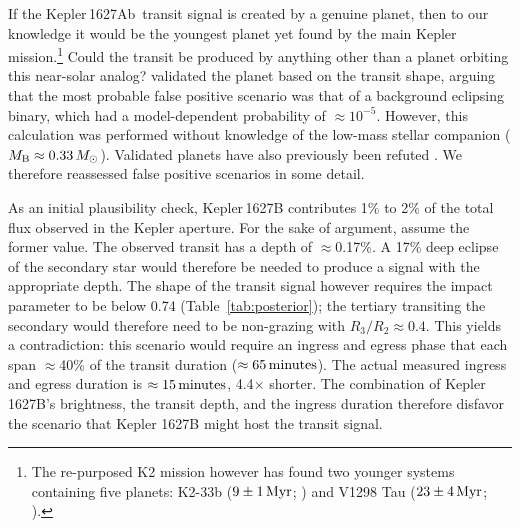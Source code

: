 \documentclass[12pt,modern,twocolumn,tighten]{aastex63}
\newcommand{\pn}{Kepler\,1627Ab} %
\begin{document}
If the \pn\ transit signal is created by a genuine planet,  then to
our knowledge it would be the youngest planet yet found by the main
Kepler mission.\footnote{The re-purposed K2 mission however has found
two younger systems containing five planets: K2-33b ($9\pm1\,{\rm
Myr}$; \citealt{Mann_K2_33b_2016,David_et_al_2017}) and V1298 Tau
($23\pm4\,{\rm Myr}$; \citealt{david_four_2019}).}   
Could the transit be produced by anything other than a planet
orbiting this near-solar analog?  \citet{morton_false_2016} validated
the planet based on the transit shape, arguing that the most probable
false positive scenario was that of a background eclipsing binary,
which had a model-dependent probability of $\approx10^{-5}$.  However,
this calculation was performed without knowledge of the low-mass stellar companion ($M_{\rm B}\approx
0.33\,M_\odot$).  
Validated planets have also previously been refuted \citep[{\it e.g.},][]{shporer_three_2017}.
We therefore reassessed
false positive scenarios in some detail. 

As an initial plausibility check,
Kepler\,1627B contributes 1\% to 2\% of the total flux observed in
the Kepler aperture.  
For the sake of argument, assume the former value.
The observed transit has a depth of $\approx$0.17\%.  A
17\% deep eclipse of the secondary star would therefore be needed to
produce a signal with the appropriate depth.  The shape of the
transit signal however requires the impact parameter to be below 0.74
(Table~\ref{tab:posterior}); the tertiary transiting the secondary would
therefore need to be non-grazing with $R_3/R_2 \approx 0.4$.
This
yields a contradiction:  this scenario would require an ingress and
egress phase that each span $\approx$40\% of the transit duration
($\approx 65\,{\rm minutes}$).  The actual measured ingress and egress
duration is $\approx 15\,{\rm minutes}$, 4.4$\times$ shorter.  The
combination of Kepler 1627B's brightness, the transit depth, and the ingress
duration therefore disfavor the scenario that Kepler 1627B might host the
transit signal.  

% 

\end{document}
